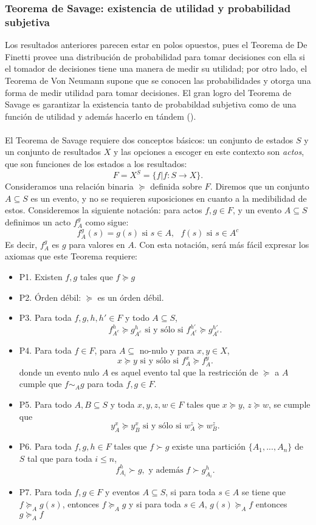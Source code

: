 \documentclass[11pt]{article}
\theoremstyle{plain}
\begin{document}
		\subsubsection{Teorema de Savage: existencia de utilidad y probabilidad subjetiva}
	    Los resultados anteriores parecen estar en polos opuestos, pues el Teorema de De Finetti provee una distribución de probabilidad para tomar decisiones con ella si el tomador de decisiones tiene una manera de medir su utilidad; por otro lado, el Teorema de Von Neumann supone que se conocen las probabilidades y otorga una forma de medir utilidad para tomar decisiones. El gran logro del Teorema de Savage es garantizar la existencia tanto de probabildad subjetiva como de una función de utilidad y además hacerlo en tándem (\cite{gilboa2009decision}).\\
	    \\
	    El Teorema de Savage requiere dos conceptos básicos: un conjunto de estados $S$ y un conjunto de resultados $X$ y las opciones a escoger en este contexto son \textit{actos}, que son funciones de los estados a los resultados:
	    \[ F = X^S = \{ f | f: S \to X \}. \]
	    Consideramos una relación binaria $\succeq$ definida sobre $F$.
	    Diremos que un conjunto $A \subseteq S$ es un evento, y no se requieren suposiciones en cuanto a la medibilidad de estos.
	    Consideremos la siguiente notación: para actos $f,g \in F$, y un evento $A \subseteq S$ definimos un acto $f_A^g$ como sigue:
	    \[ f_A^g(s)=g(s) \textrm{ si  } s \in A, \textrm{  } f(s) \textrm{ si  } s \in A^c   \]
	    Es decir, $ f_A^g$ es $g$ para valores en $A$. Con esta notación, será más fácil expresar los axiomas que este Teorema requiere:
	    \begin{itemize}
	    \item P1. Existen $f,g$ tales que $f \succeq g$
	    \item P2. Órden débil: $\succeq$ es un órden débil.
	    \item P3. Para toda $f,g,h,h' \in F$ y todo $A \subseteq S$,
	    \[ f_{A^c}^h \succeq g_{A^c}^h  \textrm{ si y sólo si }  f_{A^c}^{h'}  \succeq g_{A^c}^{h'} .\]
	    \item P4. Para toda $f \in F$, para $A \subseteq$ no-nulo y para $x,y \in X$,
	    \[ x \succeq y \textrm{ si y sólo si } f_A^x \succeq f_A^y.  \]
	    donde un evento nulo $A$ es aquel evento tal que la restricción de $\succeq$ a $A$ cumple que $f \sim_A g$ para toda $f,g \in F$.
	    \item P5. Para todo $A,B \subseteq S$ y toda $x,y,z,w \in F$ tales que $x \succeq y$, $z \succeq w$, se cumple que
	    \[ y_A^x \succeq y_B^x \textrm{ si y sólo si } w_A^z \succeq w_B^z.\]
	    \item P6. Para toda $f,g,h \in F$ tales que $f \succ g$ existe una partición $\{ A_1, ... , A_n \}$ de $S$ tal que para toda $ i \leq n$,
	    \[ f_{A_i}^h \succ g, \textrm{ y además } f \succ g_{A_i}^h. \]
	    \item P7. Para toda $f,g \in F$ y eventos $A \subseteq S$, si para toda $s \in A$ se tiene que $f \succeq_A g(s)$, entonces $f \succeq_A g$ y si para toda $s \in A$, $g(s) \succeq_A f$ entonces $g \succeq_A f$
	    \end{itemize}
\end{document}
